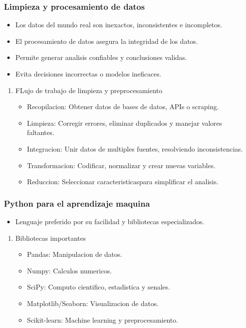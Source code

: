 \documentclass[11pt]{article}
\begin{document}
\subsubsection{Limpieza y procesamiento de datos}
\label{sec:org510d824}
\begin{itemize}
\item Los datos del mundo real son inexactos, inconsistentes e incompletos.
\item El procesamiento de datos asegura la integridad de los datos.
\item Permite generar analisis confiables y conclusiones validas.
\item Evita decisiones incorrectas o modelos ineficaces.
\end{itemize}
\begin{enumerate}
\item FLujo de trabajo de limpieza y preprocesamiento
\label{sec:orgd50a2f4}
\begin{itemize}
\item Recopilacion: Obtener datos de bases de datos, APIs o scraping.
\item Limpieza: Corregir errores, eliminar duplicados y manejar valores faltantes.
\item Integracion: Unir datos de multiples fuentes, resolviendo inconsistencias.
\item Transformacion: Codificar, normalizar y crear nuevas variables.
\item Reduccion: Seleccionar caracteristicaspara simplificar el analisis.
\end{itemize}
\end{enumerate}
\subsubsection{Python para el aprendizaje maquina}
\label{sec:org35bfaa0}
\begin{itemize}
\item Lenguaje preferido por su facilidad y bibliotecas especializados.
\end{itemize}
\begin{enumerate}
\item Bibliotecas importantes
\label{sec:orge80feb7}
\begin{itemize}
\item Pandas: Manipulacion de datos.
\item Numpy: Calculos numericos.
\item SciPy: Computo cientifico, estadistica y senales.
\item Matplotlib/Seaborn: Visualizacion de datos.
\item Scikit-learn: Machine learning y preprocesamiento.
\end{itemize}
\end{enumerate}
\end{document}
